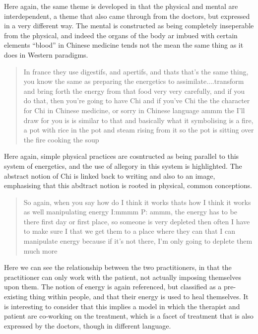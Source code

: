 Here again, the same theme is developed in that the physical and mental are interdependent, a theme that also came through from the doctors, but expressed in a very different way. The mental is constructed as being completely inseperable from the physical, and indeed the organs of the body ar imbued with certain elements ``blood'' in Chinese medicine tends not the mean the same thing as it does in Western paradigms. 

\begin{quotation}
   In france they use digestifs, and apertifs, and thats that's the same thing, you know the same as preparing the energetics to assimilate....transform and bring forth the energy from that food very very carefully, and if you do that, then you're going to have Chi and if you've Chi the the character for Chi in Chinese medicine, or sorry in Chinese language ammm the I'll draw for you is is similar to that and basically what it symbolising is a fire, a pot with rice in the pot and steam rising from it so the pot is sitting over the fire cooking the soup 

\end{quotation}

Here again, simple physical practices are cosntructed as being parallel to this system of energetics, and the use of allegory in this system is highlighted. The abstract notion of Chi is linked back to writing and also to an image, emphasising that this abdtract notion is rooted in physical, common conceptions. 


\begin{quotation}
  So again, when you say how do I think it works thats how I think it works as well manipulating energy
I:mmmm
P: ammm, the energy has to be there first day or first place, so someone is very depleted then often I have to make sure I that we get them to a place where they can that I can manipulate energy because if it's not there, I'm only going to deplete them much more


\end{quotation}

Here we can see the relationship between the two practitioners, in that the practitioner can only work with the patient, not actually imposing themselves upon them. The notion of energy is again referenced, but classified as a pre-existing thing within people, and that their energy is used to heal themselves. It is interesting to consider that this implies a model in which the therapist and patient are co-working on the treatment, which is a facet of treatment that is also expressed by the doctors, though in different language. 

